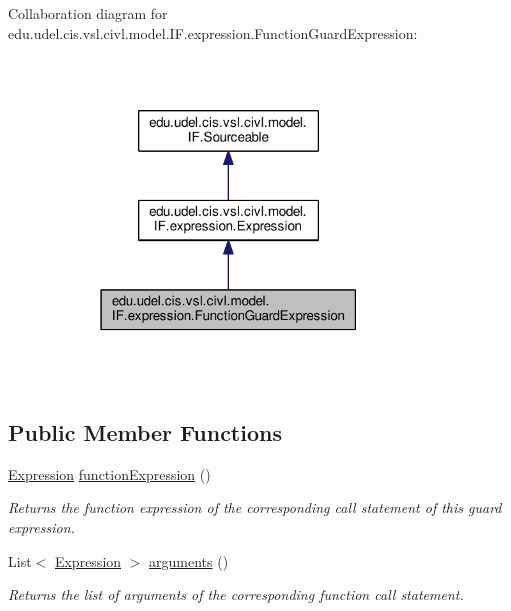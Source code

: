 Collaboration diagram for edu.\+udel.\+cis.\+vsl.\+civl.\+model.\+I\+F.\+expression.\+Function\+Guard\+Expression\+:
\nopagebreak
\begin{figure}[H]
\begin{center}
\leavevmode
\includegraphics[width=271pt]{interfaceedu_1_1udel_1_1cis_1_1vsl_1_1civl_1_1model_1_1IF_1_1expression_1_1FunctionGuardExpression__coll__graph}
\end{center}
\end{figure}
\subsection*{Public Member Functions}
\begin{DoxyCompactItemize}
\item 
\hyperlink{interfaceedu_1_1udel_1_1cis_1_1vsl_1_1civl_1_1model_1_1IF_1_1expression_1_1Expression}{Expression} \hyperlink{interfaceedu_1_1udel_1_1cis_1_1vsl_1_1civl_1_1model_1_1IF_1_1expression_1_1FunctionGuardExpression_a74d45ca76598cebc1857e7ed246027f0}{function\+Expression} ()
\begin{DoxyCompactList}\small\item\em Returns the function expression of the corresponding call statement of this guard expression. \end{DoxyCompactList}\item 
List$<$ \hyperlink{interfaceedu_1_1udel_1_1cis_1_1vsl_1_1civl_1_1model_1_1IF_1_1expression_1_1Expression}{Expression} $>$ \hyperlink{interfaceedu_1_1udel_1_1cis_1_1vsl_1_1civl_1_1model_1_1IF_1_1expression_1_1FunctionGuardExpression_a2d8c09e56009e6e098ada575672da63d}{arguments} ()
\begin{DoxyCompactList}\small\item\em Returns the list of arguments of the corresponding function call statement. \end{DoxyCompactList}\end{DoxyCompactItemize}


